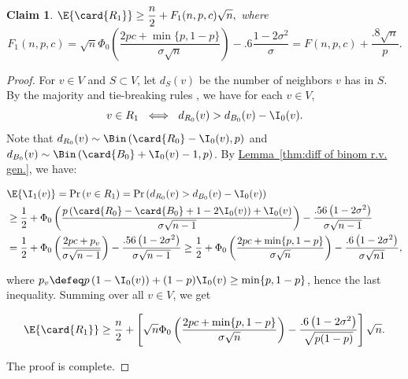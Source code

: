 \documentclass[11pt]{article}
\numberwithin{equation}{section}
\newtheorem{claim}[theorem]{Claim}
\theoremstyle{definition}
\theoremstyle{plain}
\newcommand{\expref}[2]{\hyperref[#2]{#1~\ref{#2}}}
\begin{document}
			
			
			\begin{claim} \label{claim:day-1-expection}
				$ \displaystyle
				\E{\card{R_1}} \ge \frac{n}{2} + F_1(n, p, c)\sqrt{n},
				$ where
				\[
				F_1(n, p, c) = \sqrt{n}\Phi_0\left(\frac{2pc  %
					+ \min\{p, 1 - p\}  %
				}{\sigma\sqrt{n}} \right) - .6\frac{1 - 2\sigma^2}{\sigma} = F(n, p, c) + \frac{.8\sqrt{n}}{p}.
				\]
				
			\end{claim}
			\begin{proof}
				For $v\in V$ and $S\subset V$, let $d_S(v)$ be the number of neighbors $v$ has in $S$.
				By the majority and tie-breaking rules  %
				, %
				we have for each $v\in V$,
				\begin{equation} \label{eq:a_1 meaning}
					v \in R_1 \ \iff \ d_{R_0}(v) > d_{B_0}(v) - \I_0(v).
				\end{equation}
				Note that $d_{R_0}(v) \sim \Bin\left(\card{R_0} - \I_0(v), p\right)$ and $d_{B_0}(v) \sim \Bin\left(\card{B_0} + \I_0(v) - 1, p\right)$.
				By \expref{Lemma}{thm:diff of binom r.v. gen.}, we have:
				\begin{linenomath}\begin{equation*} \label{eq:i1-v-bound}
						\begin{aligned}
							& \E{\I_1(v)} = \Pr\left(v\in R_1\right) = \Pr\left(d_{R_0}(v) > d_{B_0}(v) - \I_0(v) \right) \\
							& \ge \frac{1}{2} + \Phi_0\left(\frac{p\left(\card{R_0} - \card{B_0} + 1 - 2\I_0(v)\right) + \I_0(v)}{\sigma\sqrt{n - 1}}\right)
							- \frac{.56\left(1 - 2\sigma^2\right)}{\sigma\sqrt{n - 1}} \\
							& = \frac{1}{2} + \Phi_0\left(\frac{2pc + p_v}{\sigma\sqrt{n - 1}}\right)
							- \frac{.56\left(1 - 2\sigma^2\right)}{\sigma\sqrt{n - 1}}
							\ge \frac{1}{2} + \Phi_0\left(\frac{2pc + \min\{p, 1 - p\}}{\sigma\sqrt{n}}\right)
							- \frac{.6\left(1 - 2\sigma^2\right)}{\sigma\sqrt{n1}},  %
						\end{aligned}
				\end{equation*}\end{linenomath}
				where
				$ \displaystyle
				p_v \defeq p\left(1 - \I_0(v)\right) + (1 - p)\I_0(v) \ge %
				\min\{p, 1 - p\}  %
				$, hence the last inequality.
				Summing over all $v\in V$, we get
				\begin{linenomath}\begin{equation*}
						\begin{aligned}
							\E{\card{R_1}}
							\ge \frac{n}{2} + \left[\sqrt{n}\Phi_0\left(\frac{2pc  %
								+ \min\{p, 1 - p\}  %
							}{\sigma\sqrt{n}}\right)
							- \frac{.6\left(1 - 2\sigma^2\right)}{\sqrt{p(1 - p)}} \right] \sqrt{n}.
						\end{aligned}
				\end{equation*}\end{linenomath}
				The proof is complete.
			\end{proof}
			
\end{document}
